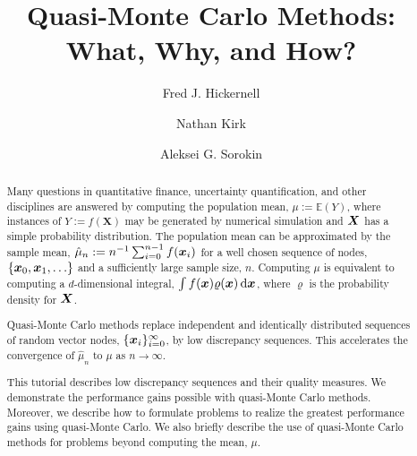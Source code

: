 \documentclass{svproc}
\begin{document}
\mainmatter              %
%
\title{Quasi-Monte Carlo Methods:  What, Why, and How?}
%
%
\author{Fred J. Hickernell \and Nathan Kirk \and Aleksei G. Sorokin}
%
%
%



\maketitle              %

\begin{abstract}
Many questions in  quantitative finance, uncertainty quantification, and other disciplines are answered by computing the population mean, $\mu := \mathbb{E}(Y)$, where instances of $Y:=f(\boldsymbol{X})$ may be generated by numerical simulation and ${\boldsymbol{X}}$ has a simple probability  distribution. The population mean can be approximated by the sample mean, $\hat{\mu}_n := n^{-1} \sum_{i=0}^{n-1} f({\boldsymbol{x}}_i)$ for a well chosen sequence of nodes, $\{{\boldsymbol{x}}_0, {\boldsymbol{x}}_1, \ldots\}$ and a sufficiently large sample size, $n$.  Computing $\mu$ is equivalent to computing a $d$-dimensional integral, $\int f({\boldsymbol{x}}) \varrho({\boldsymbol{x}}) \, \mathrm{d} {\boldsymbol{x}}$, where $\varrho$ is the probability density for ${\boldsymbol{X}}$.

Quasi-Monte Carlo methods replace independent and identically distributed  sequences of random vector nodes, $\{{\boldsymbol{x}}_i \}_{i = 0}^{\infty}$, by low discrepancy sequences.  This accelerates the convergence of $\hat{\mu}_n$ to $\mu$ as $n \to \infty$.

This tutorial describes  low discrepancy sequences  and their quality measures.  We demonstrate the performance gains possible with quasi-Monte Carlo methods.  Moreover, we describe how to formulate problems to realize the greatest performance gains using quasi-Monte Carlo.  We also briefly describe the use of quasi-Monte Carlo methods for problems beyond computing the mean, $\mu$.

\end{abstract}
%
\setcounter{tocdepth}{2}
\end{document}

